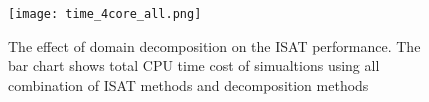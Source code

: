 \begin{figure}[htbp]
    \centering
\texttt{[image: time\_4core\_all.png]} 

\caption{The effect of domain decomposition on the ISAT performance. The bar chart shows total CPU time cost of simualtions using all combination of ISAT methods and decomposition methods}\label{MPI_4core_all} 
\end{figure}









